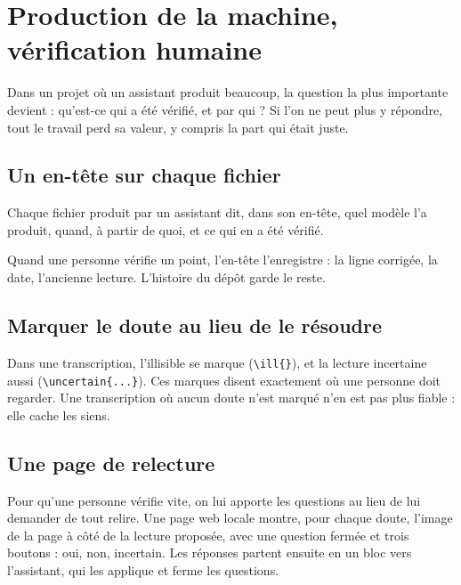 \chapter{Production de la machine, vérification humaine}\label{ch:review}

Dans un projet où un assistant produit beaucoup, la question la plus importante devient :
qu'est-ce qui a été vérifié, et par qui ? Si l'on ne peut plus y répondre, tout le travail
perd sa valeur, y compris la part qui était juste.

\section{Un en-tête sur chaque fichier}

\begin{regle}
Chaque fichier produit par un assistant dit, dans son en-tête, quel modèle l'a produit,
quand, à partir de quoi, et ce qui en a été vérifié.
\end{regle}

\begin{terminal}
\end{terminal}

Quand une personne vérifie un point, l'en-tête l'enregistre : la ligne corrigée, la date,
l'ancienne lecture. L'histoire du dépôt garde le reste.

\section{Marquer le doute au lieu de le résoudre}

Dans une transcription, l'illisible se marque (\verb|\ill{}|), et la lecture incertaine
aussi (\verb|\uncertain{...}|). Ces marques disent
exactement où une personne doit regarder. Une transcription où aucun doute n'est marqué
n'en est pas plus fiable : elle cache les siens.

\section{Une page de relecture}

Pour qu'une personne vérifie vite, on lui apporte les questions au lieu de lui demander de
tout relire. Une page web locale montre, pour chaque doute, l'image de la page à côté de la
lecture proposée, avec une question fermée et trois boutons : oui, non, incertain. Les
réponses partent ensuite en un bloc vers l'assistant, qui les applique et ferme les
questions.

